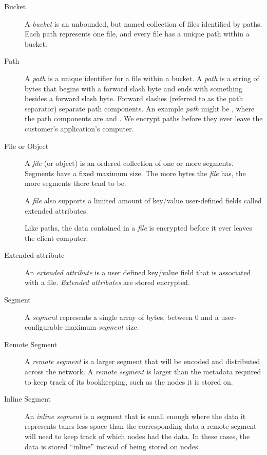 \documentclass[11pt,fleqn,openany]{book}
\begin{document}
\begin{description}
\item[Bucket] A  {\em bucket} is an unbounded, but named
collection of files identified by paths. Each path represents one
file, and every file has a unique path within a bucket.

\item[Path] A {\em path} is a unique identifier for a file within a
bucket. A {\em path} is a string of bytes that begins with a forward
slash byte and ends with something besides a forward slash byte. Forward
slashes (referred to as the path separator) separate path components.
An example {\em path} might be , where the path components are
 and .
We encrypt paths before they ever leave the customer's application's
computer.

\item[File or Object] A {\em file} (or object) is an ordered
collection of one or more segments. Segments have a fixed maximum size.
The more bytes the {\em file} has, the more segments there tend to be.

A {\em file} also supports a limited amount of key/value user-defined fields
called extended attributes.

Like paths, the data contained in a {\em file} is encrypted before it ever
leaves the client computer.

\item[Extended attribute] An {\em extended attribute} is a user defined key/value
field that is associated with a file. {\em Extended attributes} are stored encrypted.

\item[Segment] A {\em segment} represents a single array of bytes, between 0 and a
user-configurable maximum {\em segment} size.

\item[Remote Segment] A {\em remote segment} is a larger segment that will be
encoded and distributed across the network. A {\em remote segment} is larger than
the metadata required to keep track of its bookkeeping, such as the nodes it
is stored on.

\item[Inline Segment] An {\em inline segment} is a segment that is small
enough where the data it represents takes less space than the corresponding
data a remote segment will need to keep track of which nodes had the data.
In these cases, the data is stored ``inline'' instead of being stored on nodes.


\end{description}
\end{document}
